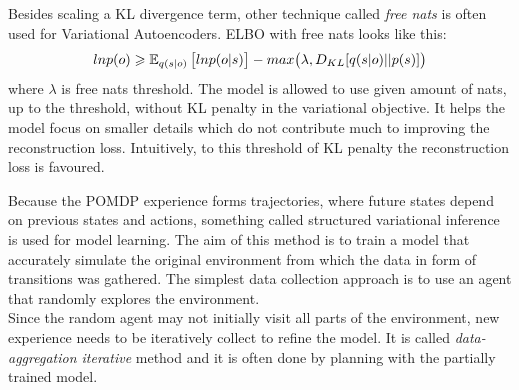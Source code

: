 Besides scaling a KL divergence term, other technique called \textit{free nats} \cite{Algo.FreeNats} is often used for Variational Autoencoders. ELBO with free nats looks like this:
$$ln p(o) \geqslant \operatorname{\mathbb{E}}_{q(s|o)}\big[ ln p(o|s) \big] - max\big( \lambda, D_{KL}[q(s|o)||p(s)] \big)$$
where $\lambda$ is free nats threshold. The model is allowed to use given amount of nats, up to the threshold, without KL penalty in the variational objective. It helps the model focus on smaller details which do not contribute much to improving the reconstruction loss. Intuitively, to this threshold of KL penalty the reconstruction loss is favoured.

Because the POMDP experience forms trajectories, where future states depend on previous states and actions, something called structured variational inference is used for model learning. The aim of this method is to train a model that accurately simulate the original environment from which the data in form of transitions was gathered. The simplest data collection approach is to use an agent that randomly explores the environment. \\
Since the random agent may not initially visit all parts of the environment, new experience needs to be iteratively collect to refine the model. It is called \textit{data-aggregation iterative} method and it is often done by planning with the partially trained model.

